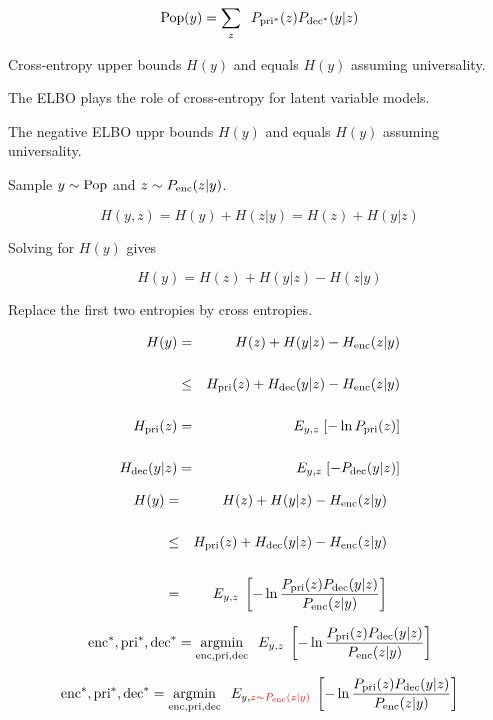 {\vfill
$$\mathrm{Pop}(y) = \sum_z\;\;P_{\mathrm{pri}^*}(z)P_{\mathrm{dec}^*}(y|z)$$



Cross-entropy upper bounds $H(y)$ and equals $H(y)$ assuming universality.

\vfill
The ELBO plays the role of cross-entropy for latent variable models.

\vfill
The negative ELBO uppr bounds $H(y)$ and equals $H(y)$ assuming universality.



Sample $y \sim \mathrm{Pop}$ and $z \sim P_{\mathrm{enc}}(z|y)$.

\vfill
$$H(y,z) = H(y) + H(z|y) = H(z) + H(y|z)$$

\vfill
Solving for $H(y)$ gives

$$H(y) = H(z) + H(y|z) - H(z|y)$$

Replace the first two entropies by cross entropies.

\vfill
\begin{eqnarray*}
H(y) & = & H(z) + H(y|z) - H_{\mathrm{enc}}(z|y) \\
\\
 & \leq & H_{\mathrm{pri}}(z) + H_{\mathrm{dec}}(y|z) - H_{\mathrm{enc}}(z|y) \\
 \\
H_{\mathrm{pri}}(z) & = & E_{y,z}\;[-\ln P_{\mathrm{pri}}(z)] \\
\\
H_{\mathrm{dec}}(y|z) & = & E_{y,z}\;[- P_{\mathrm{dec}}(y|z)]
\end{eqnarray*}

\begin{eqnarray*}
H(y) & = & H(z) + H(y|z) - H_{\mathrm{enc}}(z|y) \\
\\
 & \leq & H_{\mathrm{pri}}(z) + H_{\mathrm{dec}}(y|z) - H_{\mathrm{enc}}(z|y) \\
\\
 & = & E_{y,z}\;\left[- \ln \frac{P_{\mathrm{pri}}(z)P_{\mathrm{dec}}(y|z)}{P_{\mathrm{enc}}(z|y)}\right]
\end{eqnarray*}

\vfill
$$\mathrm{enc}^*,\mathrm{pri}^*,\mathrm{dec}^* = \operatorname*{argmin}_{\mathrm{enc},\mathrm{pri},\mathrm{dec}}\;\;E_{y,z}\;\left[- \ln \frac{P_{\mathrm{pri}}(z)P_{\mathrm{dec}}(y|z)}{P_{\mathrm{enc}}(z|y)}\right]$$



$$\mathrm{enc}^*,\mathrm{pri}^*,\mathrm{dec}^* = \operatorname*{argmin}_{\mathrm{enc},\mathrm{pri},\mathrm{dec}}\;\;E_{y,{\color{red} z\sim P_{\mathrm{enc}}(z|y)}}\;\left[- \ln \frac{P_{\mathrm{pri}}(z)P_{\mathrm{dec}}(y|z)}{P_{\mathrm{enc}}(z|y)}\right]$$

}

